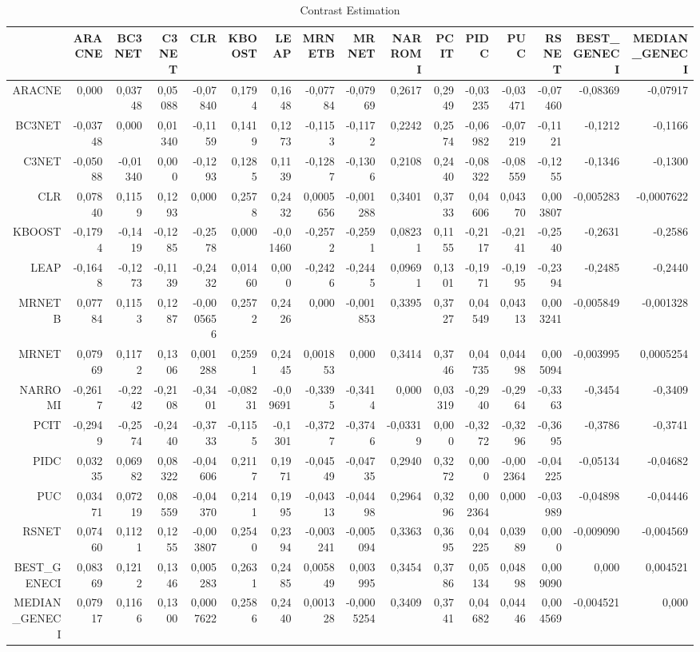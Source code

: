 \documentclass[a4paper,10pt]{article}
\begin{document}
\begin{landscape}
\newpage

\begin{table}[!htp]
\centering\tiny
\caption{Contrast Estimation}
\begin{tabular}{
|r|r|r|r|r|r|r|r|r|r|r|r|r|r|r|r|}
\hline
 &ARACNE&BC3NET&C3NET&CLR&KBOOST&LEAP&MRNETB&MRNET&NARROMI&PCIT&PIDC&PUC&RSNET&BEST_GENECI&MEDIAN_GENECI\\
\hline
ARACNE&0,000&0,03748&0,05088&-0,07840&0,1794&0,1648&-0,07784&-0,07969&0,2617&0,2949&-0,03235&-0,03471&-0,07460&-0,08369&-0,07917\\
\hline
BC3NET&-0,03748&0,000&0,01340&-0,1159&0,1419&0,1273&-0,1153&-0,1172&0,2242&0,2574&-0,06982&-0,07219&-0,1121&-0,1212&-0,1166\\
\hline
C3NET&-0,05088&-0,01340&0,000&-0,1293&0,1285&0,1139&-0,1287&-0,1306&0,2108&0,2440&-0,08322&-0,08559&-0,1255&-0,1346&-0,1300\\
\hline
CLR&0,07840&0,1159&0,1293&0,000&0,2578&0,2432&0,0005656&-0,001288&0,3401&0,3733&0,04606&0,04370&0,003807&-0,005283&-0,0007622\\
\hline
KBOOST&-0,1794&-0,1419&-0,1285&-0,2578&0,000&-0,01460&-0,2572&-0,2591&0,08231&0,1155&-0,2117&-0,2141&-0,2540&-0,2631&-0,2586\\
\hline
LEAP&-0,1648&-0,1273&-0,1139&-0,2432&0,01460&0,000&-0,2426&-0,2445&0,09691&0,1301&-0,1971&-0,1995&-0,2394&-0,2485&-0,2440\\
\hline
MRNETB&0,07784&0,1153&0,1287&-0,0005656&0,2572&0,2426&0,000&-0,001853&0,3395&0,3727&0,04549&0,04313&0,003241&-0,005849&-0,001328\\
\hline
MRNET&0,07969&0,1172&0,1306&0,001288&0,2591&0,2445&0,001853&0,000&0,3414&0,3746&0,04735&0,04498&0,005094&-0,003995&0,0005254\\
\hline
NARROMI&-0,2617&-0,2242&-0,2108&-0,3401&-0,08231&-0,09691&-0,3395&-0,3414&0,000&0,03319&-0,2940&-0,2964&-0,3363&-0,3454&-0,3409\\
\hline
PCIT&-0,2949&-0,2574&-0,2440&-0,3733&-0,1155&-0,1301&-0,3727&-0,3746&-0,03319&0,000&-0,3272&-0,3296&-0,3695&-0,3786&-0,3741\\
\hline
PIDC&0,03235&0,06982&0,08322&-0,04606&0,2117&0,1971&-0,04549&-0,04735&0,2940&0,3272&0,000&-0,002364&-0,04225&-0,05134&-0,04682\\
\hline
PUC&0,03471&0,07219&0,08559&-0,04370&0,2141&0,1995&-0,04313&-0,04498&0,2964&0,3296&0,002364&0,000&-0,03989&-0,04898&-0,04446\\
\hline
RSNET&0,07460&0,1121&0,1255&-0,003807&0,2540&0,2394&-0,003241&-0,005094&0,3363&0,3695&0,04225&0,03989&0,000&-0,009090&-0,004569\\
\hline
BEST_GENECI&0,08369&0,1212&0,1346&0,005283&0,2631&0,2485&0,005849&0,003995&0,3454&0,3786&0,05134&0,04898&0,009090&0,000&0,004521\\
\hline
MEDIAN_GENECI&0,07917&0,1166&0,1300&0,0007622&0,2586&0,2440&0,001328&-0,0005254&0,3409&0,3741&0,04682&0,04446&0,004569&-0,004521&0,000\\
\hline


\end{tabular}
\end{table}
\end{landscape}
\end{document}
